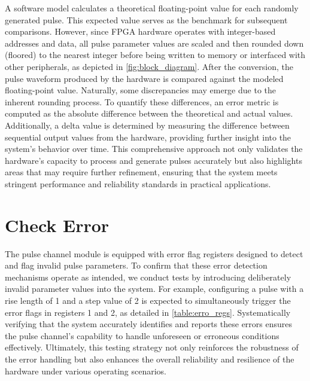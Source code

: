 A software model calculates a theoretical floating-point value for each randomly generated pulse. This expected value serves as the benchmark for subsequent comparisons. However, since FPGA hardware operates with integer-based addresses and data, all pulse parameter values are scaled and then rounded down (floored) to the nearest integer before being written to memory or interfaced with other peripherals, as depicted in \autoref{fig:block_diagram}. After the conversion, the pulse waveform produced by the hardware is compared against the modeled floating-point value. Naturally, some discrepancies may emerge due to the inherent rounding process. To quantify these differences, an error metric is computed as the absolute difference between the theoretical and actual values. Additionally, a delta value is determined by measuring the difference between sequential output values from the hardware, providing further insight into the system's behavior over time. This comprehensive approach not only validates the hardware's capacity to process and generate pulses accurately but also highlights areas that may require further refinement, ensuring that the system meets stringent performance and reliability standards in practical applications.

\section{Check Error}

The pulse channel module is equipped with error flag registers designed to detect and flag invalid pulse parameters. To confirm that these error detection mechanisms operate as intended, we conduct tests by introducing deliberately invalid parameter values into the system. For example, configuring a pulse with a rise length of 1 and a step value of 2 is expected to simultaneously trigger the error flags in registers 1 and 2, as detailed in \autoref{table:erro_regs}. Systematically verifying that the system accurately identifies and reports these errors ensures the pulse channel's capability to handle unforeseen or erroneous conditions effectively. Ultimately, this testing strategy not only reinforces the robustness of the error handling but also enhances the overall reliability and resilience of the hardware under various operating scenarios.